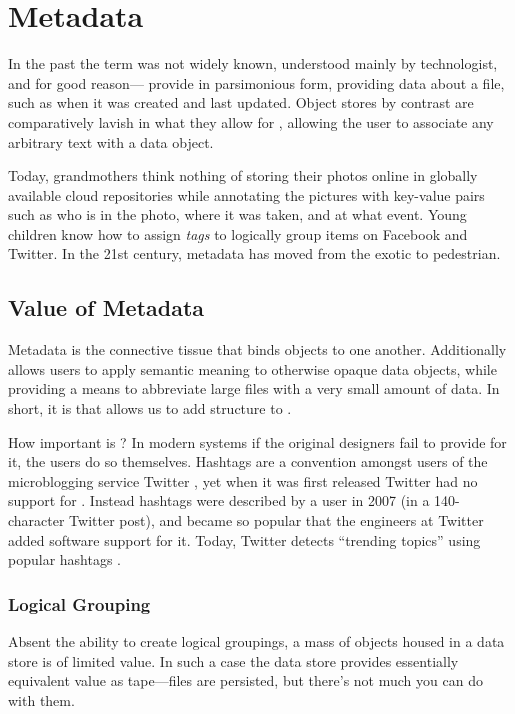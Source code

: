 
\section{Metadata} \label{s:md}
In the past the term \emph{\md} was not widely known, understood mainly by technologist, and for good reason---\fss{} provide \md{} in parsimonious form, providing data about a file, such as when it was created and last updated. Object stores by contrast are comparatively lavish in what they allow for \md{}, allowing the user to associate any arbitrary text with a data object.

Today, grandmothers think nothing of storing their photos online in globally available cloud repositories while annotating the pictures with  \md{} key-value pairs such as who is in the photo, where it was taken, and at what event. Young children know how to assign \md{} \emph{tags} to logically group items on Facebook and Twitter. In the 21st century, metadata has moved from the exotic to pedestrian.

\subsection{Value of Metadata}
Metadata is the connective tissue that binds objects to one another. Additionally \md{} allows users to apply semantic meaning to otherwise opaque data objects, while providing a means to abbreviate large files with a very small amount of data. In short, it is \md{} that allows us to add structure to \ud{}.

How important is \md{}? In modern systems if the original designers fail to provide for it, the users do so themselves. Hashtags are a \md{} convention amongst users of the microblogging service Twitter \cite{Kwak:2010:TSN:1772690.1772751}, yet when it was first released Twitter had no support for \md{}. Instead hashtags were described by a user in 2007 (in a 140-character Twitter post), and became so popular that the engineers at Twitter added software support for it. Today, Twitter detects ``trending topics'' using popular hashtags \cite{Badia:2011:CAR:2070736.2070750}.

\subsubsection{Logical Grouping}
Absent the ability to create logical groupings, a mass of objects housed in a data store is of limited value. In such a case the data store provides essentially equivalent value as tape---files are persisted, but there's not much you can do with them.

